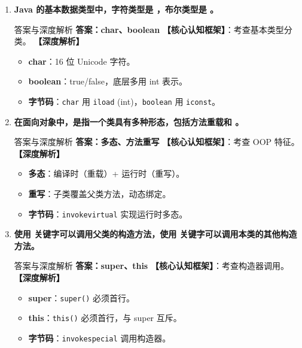 \documentclass[12pt, a4paper]{ctexart}
\newcommand{\code}[1]{\texttt{\color{myblue}#1}}
\newcommand{\blank}{\underline{\hspace{2cm}}}
\begin{document}
\begin{enumerate}[label=\arabic*.]
\item \textbf{Java 的基本数据类型中，字符类型是 \blank，布尔类型是 \blank。}
\begin{bluebox}{答案与深度解析}
\textbf{答案：char、boolean}
\textbf{【核心认知框架】}：考查基本类型分类。
\textbf{【深度解析】}
\begin{itemize}[leftmargin=*, nosep]
    \item \textbf{char}：16 位 Unicode 字符。
    \item \textbf{boolean}：true/false，底层多用 int 表示。
    \item \textbf{字节码}：\code{char} 用 \code{iload} (int)，\code{boolean} 用 \code{iconst}。
\end{itemize}
\end{bluebox}

\item \textbf{在面向对象中，\blank 是指一个类具有多种形态，包括方法重载和 \blank。}
\begin{bluebox}{答案与深度解析}
\textbf{答案：多态、方法重写}
\textbf{【核心认知框架】}：考查 OOP 特征。
\textbf{【深度解析】}
\begin{itemize}[leftmargin=*, nosep]
    \item \textbf{多态}：编译时（重载）+ 运行时（重写）。
    \item \textbf{重写}：子类覆盖父类方法，动态绑定。
    \item \textbf{字节码}：\code{invokevirtual} 实现运行时多态。
\end{itemize}
\end{bluebox}

\item \textbf{使用 \blank 关键字可以调用父类的构造方法，使用 \blank 关键字可以调用本类的其他构造方法。}
\begin{bluebox}{答案与深度解析}
\textbf{答案：super、this}
\textbf{【核心认知框架】}：考查构造器调用。
\textbf{【深度解析】}
\begin{itemize}[leftmargin=*, nosep]
    \item \textbf{super}：\code{super()} 必须首行。
    \item \textbf{this}：\code{this()} 必须首行，与 super 互斥。
    \item \textbf{字节码}：\code{invokespecial} 调用构造器。
\end{itemize}
\end{bluebox}


\end{enumerate}
\end{document}
